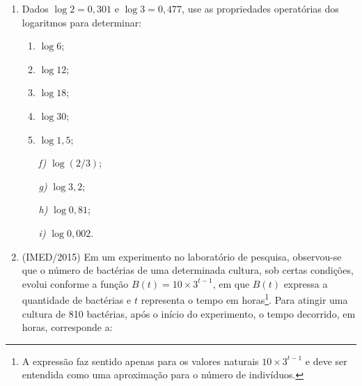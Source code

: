 \begin{enumerate}

\item {}\label{CalculeProp}

Dados $\log 2 = 0{,}301$ e $\log 3 = 0{,}477$, use as propriedades operatórias dos logaritmos para determinar:

\begin{minipage}{0.45\linewidth}
\begin{enumerate}
\item $\log 6$;
\item $\log 12$;
\item $\log 18$;
\item $\log 30$;
\item $\log 1{,}5$;
\end{enumerate}
\end{minipage}
\begin{minipage}{0.45\linewidth}
\begin{enumerate}
\item[\textit{f)}] $\log (2/3)$;
\item[\textit{g)}] $\log 3{,}2$;
\item[\textit{h)}] $\log 0{,}81$;
\item[\textit{i)}] $\log 0{,}002$.
\end{enumerate}
\end{minipage}

\item {}\label{IMED2015}

(IMED/2015) Em um experimento no laboratório de pesquisa, observou-se que o número de bactérias de uma determinada cultura, sob certas condições, evolui conforme a função $B(t)= 10\times 3^{t-1}$, em que $B(t)$ expressa a quantidade de bactérias e $t$ representa o tempo em horas\footnote{A expressão faz sentido apenas para os valores naturais $10\times 3^{t-1}$ e deve ser entendida como uma aproximação para o número de indivíduos.}. Para atingir uma cultura de 810 bactérias, após o início do experimento, o tempo decorrido, em horas, corresponde a:
\begin{enumerate}
\end{enumerate}


\end{enumerate}
